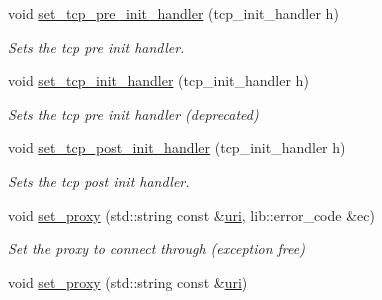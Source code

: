\begin{DoxyCompactItemize}
\item 
void \hyperlink{classwebsocketpp_1_1transport_1_1asio_1_1connection_ac71341129ff5389fa84cd9ef13c8c05e}{set\+\_\+tcp\+\_\+pre\+\_\+init\+\_\+handler} (tcp\+\_\+init\+\_\+handler h)
\begin{DoxyCompactList}\small\item\em Sets the tcp pre init handler. \end{DoxyCompactList}\item 
void \hyperlink{classwebsocketpp_1_1transport_1_1asio_1_1connection_abb0254e3207691c45c9ca7061352a90a}{set\+\_\+tcp\+\_\+init\+\_\+handler} (tcp\+\_\+init\+\_\+handler h)
\begin{DoxyCompactList}\small\item\em Sets the tcp pre init handler (deprecated) \end{DoxyCompactList}\item 
void \hyperlink{classwebsocketpp_1_1transport_1_1asio_1_1connection_a069b63faee90061ed4fa4e66d221ac18}{set\+\_\+tcp\+\_\+post\+\_\+init\+\_\+handler} (tcp\+\_\+init\+\_\+handler h)
\begin{DoxyCompactList}\small\item\em Sets the tcp post init handler. \end{DoxyCompactList}\item 
void \hyperlink{classwebsocketpp_1_1transport_1_1asio_1_1connection_a9638063c7c8c90c74d97008dacd81095}{set\+\_\+proxy} (std\+::string const \&\hyperlink{classwebsocketpp_1_1uri}{uri}, lib\+::error\+\_\+code \&ec)
\begin{DoxyCompactList}\small\item\em Set the proxy to connect through (exception free) \end{DoxyCompactList}\item 
void \hyperlink{classwebsocketpp_1_1transport_1_1asio_1_1connection_a8bd4c1b8ffbe04230249567e3217acfb}{set\+\_\+proxy} (std\+::string const \&\hyperlink{classwebsocketpp_1_1uri}{uri})\hypertarget{classwebsocketpp_1_1transport_1_1asio_1_1connection_a8bd4c1b8ffbe04230249567e3217acfb}{}\label{classwebsocketpp_1_1transport_1_1asio_1_1connection_a8bd4c1b8ffbe04230249567e3217acfb}


\end{DoxyCompactItemize}
